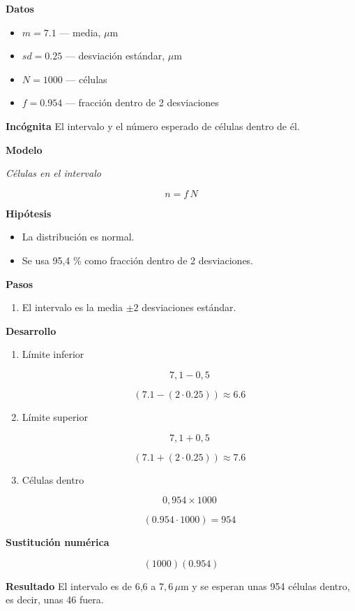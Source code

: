 \documentclass{book}
\begin{document}
\noindent\textbf{Datos}
\begin{itemize}
\item $m = 7.1$ — media, \(\mu\mathrm{m}\)
\item $sd = 0.25$ — desviación estándar, \(\mu\mathrm{m}\)
\item $N = 1000$ — células
\item $f = 0.954$ — fracción dentro de 2 desviaciones
\end{itemize}

\noindent\textbf{Incógnita}
El intervalo y el número esperado de células dentro de él.


\noindent\textbf{Modelo}

\noindent\textit{Células en el intervalo}

\[
n = f\,N
\]

\noindent\textbf{Hipótesis}
\begin{itemize}
\item La distribución es normal.
\item Se usa 95,4 \% como fracción dentro de 2 desviaciones.
\end{itemize}

\noindent\textbf{Pasos}
\begin{enumerate}
\item
El intervalo es la media \(\pm 2\) desviaciones estándar.

\end{enumerate}

\noindent\textbf{Desarrollo}
\begin{enumerate}
\item
Límite inferior


\[
7,1 - 0,5
\]

\[
\left(7.1-\left(2\cdot 0.25\right)\right) \approx 6.6
\]
\item
Límite superior


\[
7,1 + 0,5
\]

\[
\left(7.1+\left(2\cdot 0.25\right)\right) \approx 7.6
\]
\item
Células dentro


\[
0,954 \times 1000
\]

\[
\left(0.954\cdot 1000\right) = 954
\]
\end{enumerate}

\noindent\textbf{Sustitución numérica}

\[
\left(1000\right) \left(0.954\right)
\]

\noindent\textbf{Resultado}
El intervalo es de 6,6 a \(7{,}6\,\mu\mathrm{m}\) y se esperan unas 954 células dentro, es decir, unas 46 fuera.
\end{document}
